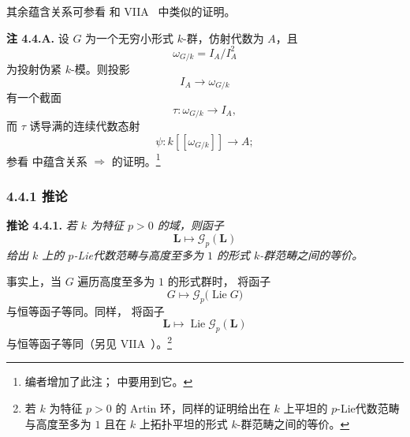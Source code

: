 其余蕴含关系可参看  和 VIIA~ 中类似的证明。

\medskip
\noindent\textbf{注 4.4.A.}
\label{sga3:VIIB:4.4.A}
设 \(G\) 为一个无穷小形式 \(k\)-群，仿射代数为 \(A\)，且
\[
  \omega_{G/k}=I_A/I_A^2
\]
为投射伪紧 \(k\)-模。则投影
\[
  I_A\longrightarrow\omega_{G/k}
\]
有一个截面
\[
  \tau:\omega_{G/k}\longrightarrow I_A,
\]
而 \(\tau\) 诱导满的连续代数态射
\[
  \psi:k[[\omega_{G/k}]]\longrightarrow A;
\]
参看  中蕴含关系 \textup{} \(\Rightarrow\) \textup{} 的证明。\footnote{%
\label{sga3:VIIB:nde:139}编者增加了此注； 中要用到它。}

\subsubsection*{4.4.1 推论}
\label{sga3:VIIB:4.4.1}

\noindent\textbf{推论 4.4.1.}
{\itshape 若 \(k\) 为特征 \(p>0\) 的域，则函子
\[
  \mathbf L\longmapsto\mathscr G_p(\mathbf L)
\]
给出 \(k\) 上的 \(p\)-Lie代数范畴与高度至多为 \(1\) 的形式 \(k\)-群范畴之间的等价。}

事实上，当 \(G\) 遍历高度至多为 \(1\) 的形式群时， 将函子
\[
  G\longmapsto\mathscr G_p\bigl(\operatorname{Lie}G\bigr)
\]
与恒等函子等同。同样， 将函子
\[
  \mathbf L\longmapsto
  \operatorname{Lie}\mathscr G_p(\mathbf L)
\]
与恒等函子等同\textup{（另见 VIIA~）}。\footnote{%
\label{sga3:VIIB:nde:140}若 \(k\) 为特征 \(p>0\) 的 Artin 环，同样的证明给出在 \(k\) 上平坦的 \(p\)-Lie代数范畴与高度至多为 \(1\) 且在 \(k\) 上拓扑平坦的形式 \(k\)-群范畴之间的等价。}
